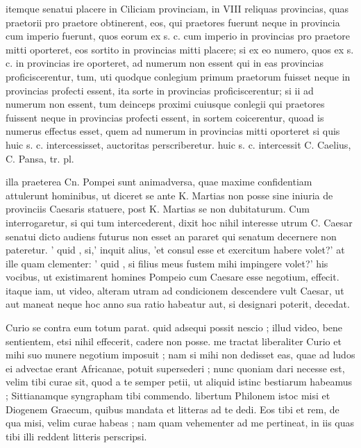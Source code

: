  itemque senatui placere in Ciliciam provinciam, in VIII reliquas provincias, quas praetorii pro praetore obtinerent, eos, qui praetores fuerunt neque in provincia cum imperio fuerunt, quos eorum ex s. c. cum imperio in provincias pro praetore mitti oporteret, eos sortito in provincias mitti placere; si ex eo numero, quos ex s. c. in provincias ire oporteret, ad numerum non essent qui in eas provincias proficiscerentur, tum, uti quodque conlegium primum praetorum fuisset neque in provincias profecti essent, ita sorte in provincias proficiscerentur; si ii ad numerum non essent, tum deinceps proximi cuiusque conlegii qui praetores fuissent neque in provincias profecti essent, in sortem coicerentur, quoad is numerus effectus esset, quem ad numerum in provincias mitti oporteret si quis huic s. c. intercessisset, auctoritas perscriberetur. huic s. c. intercessit C. Caelius, C. Pansa, tr. pl.

 illa praeterea Cn. Pompei sunt animadversa, quae maxime confidentiam attulerunt hominibus, ut diceret se ante K. Martias non posse sine iniuria de provinciis Caesaris statuere, post K. Martias se non dubitaturum. Cum interrogaretur, si qui tum intercederent, dixit hoc nihil interesse utrum C. Caesar senatui dicto audiens futurus non esset an pararet qui senatum decernere non pateretur. ' quid , si,' inquit alius, 'et consul esse et exercitum habere volet?' at ille quam clementer: ' quid , si filius meus fustem mihi impingere volet?' his vocibus, ut existimarent homines Pompeio cum Caesare esse negotium, effecit. itaque iam, ut video, alteram utram ad condicionem descendere vult Caesar, ut aut maneat neque hoc anno sua ratio habeatur aut, si designari poterit, decedat.

 Curio se contra eum totum parat. quid adsequi possit nescio ; illud video, bene sentientem, etsi nihil effecerit, cadere non posse. me tractat liberaliter Curio et mihi suo munere negotium imposuit ; nam si mihi non dedisset eas, quae ad ludos ei advectae erant Africanae, potuit supersederi ; nunc quoniam dari necesse est, velim tibi curae sit, quod a te semper petii, ut aliquid istinc bestiarum habeamus ; Sittianamque syngrapham tibi commendo. libertum Philonem istoc misi et Diogenem Graecum, quibus mandata et litteras ad te dedi. Eos tibi et rem, de qua misi, velim curae habeas ; nam quam vehementer ad me pertineat, in iis quas tibi illi reddent litteris perscripsi.
